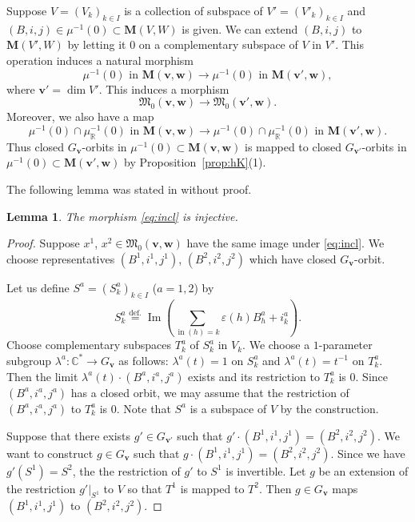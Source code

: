\documentclass[12pt]{amsart}
\def\Bbb{\mathbb}
\def\frak{\mathfrak}
\newtheorem{Lemma}[equation]{Lemma}
\theoremstyle{definition}
\theoremstyle{remark}
\numberwithin{equation}{subsection}
\newcommand{\propref}[1]{Proposition~\ref{#1}}
\newcommand{\defeq}{\overset{\operatorname{\scriptstyle def.}}{=}}
\newcommand{\C}{{\Bbb C}}
\newcommand{\R}{{\Bbb R}}
\newcommand{\Ima}{\operatorname{Im}}
\newcommand{\vin}{\operatorname{in}} %
\newcommand{\bM}{{\mathbf M}} %
\newcommand{\M}{{\frak M}} %
\newcommand{\bv}{{\mathbf v}} %
\newcommand{\bw}{{\mathbf w}} %
\begin{document}
Suppose $V = (V_k)_{k\in I}$ is a collection of subspace of 
$V' = (V'_k)_{k\in I}$ and $(B,i,j)\in\mu^{-1}(0)\subset\bM(V,W)$ is
given. We can extend $(B,i,j)$ to $\bM(V',W)$ by letting it $0$ on
a complementary subspace of $V$ in $V'$. This operation induces a
natural morphism
\begin{equation}\label{eq:incl'}
   \text{$\mu^{-1}(0)$ in $\bM(\bv,\bw)$} \to
   \text{$\mu^{-1}(0)$ in $\bM(\bv',\bw)$},
\end{equation}
where $\bv' = \dim V'$. This induces a morphism
\begin{equation}\label{eq:incl}
   \M_0(\bv,\bw) \to \M_0(\bv',\bw).
\end{equation}
Moreover, we also have a map
\begin{equation*}
   \text{$\mu^{-1}(0)\cap\mu_\R^{-1}(0)$ in $\bM(\bv,\bw)$} \to
   \text{$\mu^{-1}(0)\cap\mu_\R^{-1}(0)$ in $\bM(\bv',\bw)$}.
\end{equation*}
Thus closed $G_\bv$-orbits in $\mu^{-1}(0)\subset \bM(\bv,\bw)$ is
mapped to closed $G_{\bv'}$-orbits in $\mu^{-1}(0)\subset \bM(\bv',\bw)$
by \propref{prop:hK}(1).

The following lemma was stated in \cite[p.529]{Na-alg} without proof.

\begin{Lemma}\label{lem:incl_inj}
The morphism \eqref{eq:incl} is injective.
\end{Lemma}

\begin{proof}
Suppose $x^1$, $x^2\in\M_0(\bv,\bw)$ have the same 
image under \eqref{eq:incl}. We choose representatives
$(B^1,i^1,j^1)$, $(B^2,i^2,j^2)$ which have closed $G_{\bv}$-orbit.

Let us define $S^a = (S^a_k)_{k\in I}$ ($a = 1,2$) by
\begin{equation*}
  S^a_k \defeq
  \Ima\left(\sum_{\vin(h)=k} \varepsilon(h) B^a_h + i^a_k\right).
\end{equation*}
Choose complementary subspaces $T_k^a$ of $S^a_k$ in $V_k$. We
choose a $1$-parameter subgroup $\lambda^a\colon\C^*\to G_{\bv}$ as
follows: $\lambda^a(t) = 1$ on $S^a_k$ and $\lambda^a(t) = t^{-1}$ on
$T_k^a$. Then the limit $\lambda^a(t)\cdot (B^a,i^a,j^a)$ exists and
its restriction to $T_k^a$ is $0$. Since $(B^a,i^a,j^a)$ has a closed
orbit, we may assume that the restriction of $(B^a,i^a,j^a)$ to
$T_k^a$ is $0$. Note that $S^a$ is a subspace of $V$ by the construction.

Suppose that there exists $g'\in G_{\bv'}$ such that $g'\cdot
(B^1,i^1,j^1) = (B^2,i^2,j^2)$. We want to construct $g\in G_\bv$ such
that $g\cdot (B^1,i^1,j^1) = (B^2,i^2,j^2)$.  Since we have $g'(S^1) =
S^2$, the the restriction of $g'$ to $S^1$ is invertible. Let $g$ be
an extension of the restriction $g'|_{S^1}$ to $V$ so that $T^1$ is
mapped to $T^2$. Then $g\in G_\bv$ maps $(B^1,i^1,j^1)$ to
$(B^2,i^2,j^2)$.
\end{proof}
\end{document}
